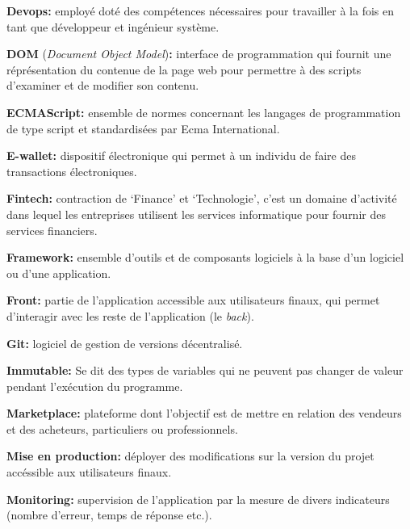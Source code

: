 \documentclass[12pt,a4paper]{article}
\begin{document}
  \bigskip

  \textbf{Devops:} employé doté des compétences nécessaires pour
  travailler à la fois en tant que développeur et ingénieur système.

  \bigskip

  \textbf{DOM} (\emph{Document Object Model})\textbf{:} interface de
  programmation qui fournit une réprésentation du contenue de la page web
  pour permettre à des scripts d'examiner et de modifier son contenu.

  \bigskip

  \textbf{ECMAScript:} ensemble de normes concernant les langages de
  programmation de type script et standardisées par Ecma International.

  \bigskip

  \textbf{E-wallet:} dispositif électronique qui permet à un individu de
  faire des transactions électroniques.

  \bigskip

  \textbf{Fintech:} contraction de `Finance' et `Technologie', c'est un
  domaine d'activité dans lequel les entreprises utilisent les services
  informatique pour fournir des services financiers.

  \bigskip

  \textbf{Framework:} ensemble d'outils et de composants logiciels à la
  base d'un logiciel ou d'une application.

  \bigskip

  \textbf{Front:} partie de l'application accessible aux utilisateurs
  finaux, qui permet d'interagir avec les reste de l'application (le
  \emph{back}).

  \bigskip

  \textbf{Git:} logiciel de gestion de versions décentralisé.

  \bigskip

  \textbf{Immutable:} Se dit des types de variables qui ne peuvent pas
  changer de valeur pendant l'exécution du programme.

  \bigskip

  \textbf{Marketplace:} plateforme dont l'objectif est de mettre en
  relation des vendeurs et des acheteurs, particuliers ou professionnels.

  \bigskip

  \textbf{Mise en production:} déployer des modifications sur la version
  du projet accéssible aux utilisateurs finaux.

  \bigskip

  \textbf{Monitoring:} supervision de l'application par la mesure de
  divers indicateurs (nombre d'erreur, temps de réponse etc.).
\end{document}

